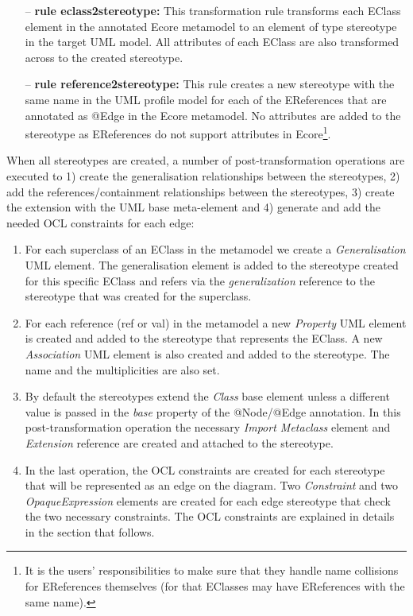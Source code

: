 \begin{itemize}
	\item[--] \textbf{rule eclass2stereotype:} This transformation rule transforms each EClass element in the annotated Ecore metamodel to an element of type stereotype in the target UML model. 
	All attributes of each EClass are also transformed across to the created stereotype. 
	\item[--] \textbf{rule reference2stereotype:} This rule creates a new stereotype with the same name in the UML profile model for each of the EReferences that are annotated as @Edge in the Ecore metamodel. 
	No attributes are added to the stereotype as EReferences do not support attributes in Ecore\footnote{It is the users' responsibilities to make sure that they handle name collisions for EReferences themselves (for that EClasses may have EReferences with the same name).}.
\end{itemize}

When all stereotypes are created, a number of post-transformation operations are executed to 1) create the generalisation relationships between the stereotypes, 2) add the references/containment relationships between the stereotypes, 3) create the extension with the UML base meta-element and 4) generate and add the needed OCL constraints for each edge: 

\begin{enumerate}[label=\arabic*)]
	\item For each superclass of an EClass in the metamodel we create a \textit{Generalisation} UML element. 
	The generalisation element is added to the stereotype created for this specific EClass and refers via the \textit{generalization} reference to the stereotype that was created for the superclass.
	\item For each reference (ref or val) in the metamodel a new \textit{Property} UML element is created and added to the stereotype that represents the EClass. 
	A new \textit{Association} UML element is also created and added to the stereotype. The name and the multiplicities are also set.
	\item By default the stereotypes extend the \textit{Class} base element unless a different value is passed in the \textit{base} property of the @Node/@Edge annotation. 
	In this post-transformation operation the necessary \textit{Import Metaclass} element and \textit{Extension} reference are created and attached to the stereotype.
	\item In the last operation, the OCL constraints are created for each stereotype that will be represented as an edge on the diagram. 
	Two \textit{Constraint} and two \textit{OpaqueExpression} elements are created for each edge stereotype that check the two necessary constraints. 
	The OCL constraints are explained in details in the section that follows.
\end{enumerate}

